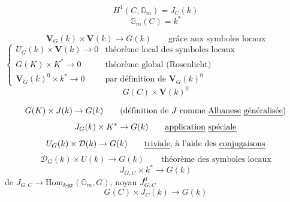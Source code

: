 \documentclass[11pt,a4paper]{article}
\begin{document}

\[
H^1(C, \mathbb{G}_m) = J_C(k)
\]
\[
\mathbb{G}_m(C) = k^{*}
\]

\[
\mathbf{V}_G(k) \times \mathbf{V}(k) \to G(k) \qquad \text{grâce aux symboles locaux}
\]
$\left\lbrace
\begin{array}{ll}
U_G(k) \times \mathbf{V}(k) \to 0 & \text{théorème local des symboles locaux} \\
G(K) \times K^{*} \to 0 & \text{théorème global (Rosenlicht)} \\
\mathbf{V}_G(k)^{0} \times k^{*} \to 0 & \text{par définition de } \mathbf{V}_G(k)^{0}
\end{array}\right.$
\[
G(C) \times \mathbf{V}(k)^{0}
\]

\[
G(K) \times J(k) \to G(k) \qquad (\text{définition de } J \text{ comme \uncertain{Albanese} \uncertain{généralisée}})
\]
\[
J_G(k) \times K^{*} \to G(k) \qquad \text{\uncertain{application} \uncertain{spéciale}}
\]
\[
U_G(k) \times \mathcal{D}(k) \to G(k) \qquad \text{\uncertain{triviale}, à l'aide des \uncertain{conjugaisons}}
\]
\[
\mathcal{D}_G(k) \times U(k) \to G(k) \qquad \text{théorème des symboles locaux}
\]
\[
J_{G,C} \times k^{*} \to G(k)
\]
 de $J_{G,C} \to \mathrm{Hom}_{k\text{-gr}}(\mathbb{G}_m, G)$,
noyau $J^{0}_{G,C}$
\[
G(C) \times J_C(k) \to G(k)
\]
\end{document}
